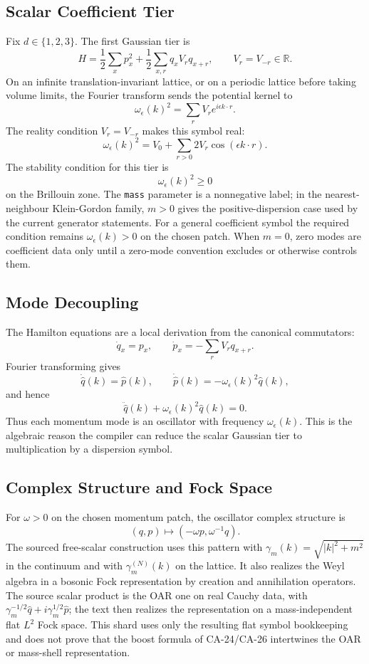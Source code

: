 \subsection{Scalar Coefficient Tier}

Fix \(d\in\{1,2,3\}\).  The first Gaussian tier is
\[
  H
  =
  \frac{1}{2}\sum_x p_x^2
  +
  \frac{1}{2}\sum_{x,r}q_xV_rq_{x+r},
  \qquad
  V_r=V_{-r}\in\mathbb R .
\]
On an infinite translation-invariant lattice, or on a periodic lattice before
taking volume limits, the Fourier transform sends the potential kernel to
\[
  \omega_\epsilon(k)^2
  =
  \sum_r V_r e^{i\epsilon k\cdot r}.
\]
The reality condition \(V_r=V_{-r}\) makes this symbol real:
\[
  \omega_\epsilon(k)^2
  =
  V_0+\sum_{r>0}2V_r\cos(\epsilon k\cdot r).
\]
The stability condition for this tier is
\[
  \omega_\epsilon(k)^2\ge 0
\]
on the Brillouin zone.  The \texttt{mass} parameter is a nonnegative label; in
the nearest-neighbour Klein-Gordon family, \(m>0\) gives the positive-dispersion
case used by the current generator statements.  For a general coefficient
symbol the required condition remains \(\omega_\epsilon(k)>0\) on the chosen
patch.  When \(m=0\), zero modes are coefficient data only until a zero-mode
convention excludes or otherwise controls them.

\subsection{Mode Decoupling}

The Hamilton equations are a local derivation from the canonical commutators:
\[
  \dot q_x=p_x,
  \qquad
  \dot p_x=-\sum_rV_rq_{x+r}.
\]
Fourier transforming gives
\[
  \dot{\widehat q}(k)=\widehat p(k),
  \qquad
  \dot{\widehat p}(k)=-\omega_\epsilon(k)^2\widehat q(k),
\]
and hence
\[
  \ddot{\widehat q}(k)+\omega_\epsilon(k)^2\widehat q(k)=0.
\]
Thus each momentum mode is an oscillator with frequency \(\omega_\epsilon(k)\).
This is the algebraic reason the compiler can reduce the scalar Gaussian tier
to multiplication by a dispersion symbol.

\subsection{Complex Structure and Fock Space}

For \(\omega>0\) on the chosen momentum patch, the oscillator complex structure is
\[
  (q,p)\longmapsto (-\omega p,\omega^{-1}q).
\]
The sourced free-scalar construction uses this pattern with
\(\gamma_m(k)=\sqrt{|k|^2+m^2}\) in the continuum and with
\(\gamma_m^{(N)}(k)\) on the lattice.  It also realizes the Weyl algebra in a
bosonic Fock representation by creation and annihilation operators.
The source scalar product is the OAR one on real Cauchy data, with
\(\gamma_m^{-1/2}\widehat q+i\gamma_m^{1/2}\widehat p\); the text then realizes
the representation on a mass-independent flat \(L^2\) Fock space.  This shard
uses only the resulting flat symbol bookkeeping and does not prove that the
boost formula of CA-24/CA-26 intertwines the OAR or mass-shell representation.

